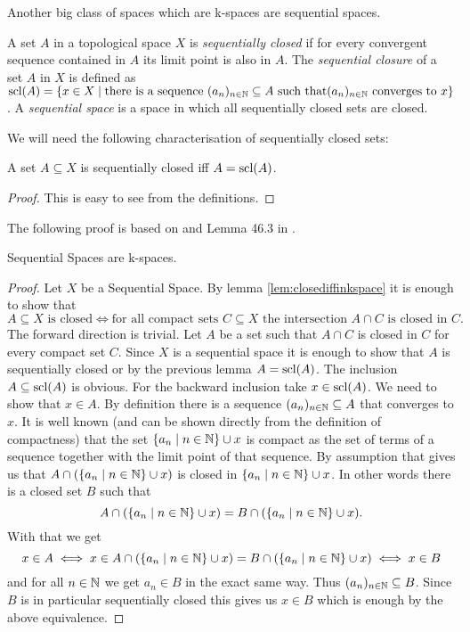 Another big class of spaces which are k-spaces are sequential spaces. 

\begin{defi}
    A set $A$ in a topological space $X$ is \emph{sequentially closed} if for every convergent sequence contained in $A$ its limit point is also in $A$. 
    The \emph{sequential closure} of a set $A$ in $X$ is defined as $\text{scl}(A) = \{ x \in X \mid \text{there is a sequence } (a_n)_{n \in \mathbb{N}} \subseteq A \text{ such that} (a_n)_{n \in \mathbb{N}} \text{ converges to } x\}$.
    A \emph{sequential space} is a space in which all sequentially closed sets are closed.
\end{defi}

We will need the following characterisation of sequentially closed sets: 

\begin{lem}
    A set $A \subseteq X$ is sequentially closed iff $A = \text{scl}(A)$.
\end{lem}
\begin{proof}
    This is easy to see from the definitions.
\end{proof}

The following proof is based on \cite{Scott2016} and Lemma 46.3 in \cite{Munkres2014}. 

\begin{lem} \label{lem:sequentialiskspace}
    Sequential Spaces are k-spaces.
\end{lem}
\begin{proof}
    Let $X$ be a Sequential Space. 
    By lemma \ref{lem:closediffinkspace} it is enough to show that 
    \[A \subseteq X \text{ is closed} \iff \text{for all compact sets } C \subseteq X \text{ the intersection } A \cap C \text{ is closed in } C.\]
    The forward direction is trivial.
    Let $A$ be a set such that $A \cap C$ is closed in $C$ for every compact set $C$. 
    Since $X$ is a sequential space it is enough to show that $A$ is sequentially closed or by the previous lemma $A  = \text{scl}(A)$.
    The inclusion $A \subseteq \text{scl}(A)$ is obvious. 
    For the backward inclusion take $x \in \text{scl}(A)$. 
    We need to show that $x \in A$.
    By definition there is a sequence $(a_n)_{n \in \mathbb{N}} \subseteq A$ that converges to $x$. 
    It is well known (and can be shown directly from the definition of compactness) that the set $\{a_n \mid n \in \mathbb{N}\} \cup {x}$ is compact as the set of terms of a sequence together with the limit point of that sequence.
    By assumption that gives us that $A \cap (\{a_n \mid n \in \mathbb{N}\} \cup {x})$ is closed in $\{a_n \mid n \in \mathbb{N}\} \cup {x}$. 
    In other words there is a closed set $B$ such that 
    \[A \cap (\{a_n \mid n \in \mathbb{N}\} \cup {x}) = B \cap (\{a_n \mid n \in \mathbb{N}\} \cup {x}).\]
    With that we get
    \[x \in A \iff x \in A \cap (\{a_n \mid n \in \mathbb{N}\} \cup {x}) = B \cap (\{a_n \mid n \in \mathbb{N}\} \cup {x}) \iff x \in B\]
    and for all $n \in \mathbb{N}$ we get $a_n \in B$ in the exact same way. 
    Thus $(a_n)_{n \in \mathbb{N}} \subseteq B$.
    Since $B$ is in particular sequentially closed this gives us $x \in B$ which is enough by the above equivalence.
\end{proof}

